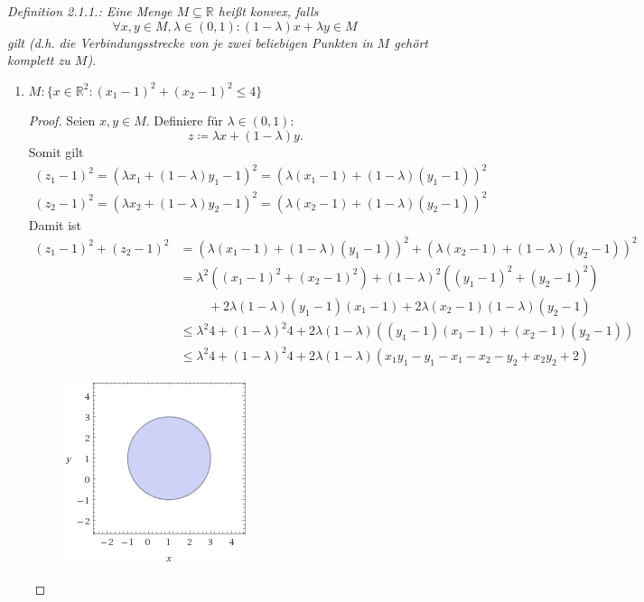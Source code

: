 \documentclass[12pt]{extreport} %
\newcommand{\R}{\mathbb{R}}
\theoremstyle{named}
\theoremstyle{nnamed}
\theoremstyle{itshape}
\theoremstyle{normal}
\begin{document}
\textit{Definition 2.1.1.:  Eine Menge $M \subseteq \R$ heißt konvex, falls}
$$  \forall x, y \in M, \lambda \in (0, 1): (1-\lambda)x + \lambda y \in M $$
\textit{gilt (d.h. die Verbindungsstrecke von je zwei beliebigen Punkten in $M$ gehört komplett zu $M$).}

\begin{enumerate}
	\item $M \colon \big\{ x \in \R^2 \colon \left( x_1 - 1 \right)^2 + \left( x_2 - 1 \right)^2 \leq 4 \big\}$
		\begin{proof}
			Seien $x, y \in M$. Definiere für $\lambda \in (0, 1)$:
			$$ z \coloneqq \lambda x + (1 - \lambda) y . $$
			Somit gilt
			\begin{align*}
				(z_1 - 1)^2 = (\lambda x_1 + (1 - \lambda) y_1 - 1)^2 = (\lambda (x_1 - 1) + (1 - \lambda) (y_1 - 1))^2 \\
				(z_2 - 1)^2 = (\lambda x_2 + (1 - \lambda) y_2 - 1)^2 = (\lambda (x_2 - 1) + (1 - \lambda) (y_2 - 1))^2		 
			\end{align*}
			Damit ist
			\begin{align*}
				(z_1 - 1)^2 + (z_2 - 1)^2 & = (\lambda (x_1 - 1) + (1 - \lambda) (y_1 - 1))^2 + (\lambda (x_2 - 1) + (1 - \lambda) (y_2 - 1))^2 \\
				& = \lambda^2 \left( (x_1 - 1)^2  + (x_2 - 1)^2 \right) + (1 - \lambda)^2 \left( (y_1 - 1)^2 +  (y_2 - 1)^2 \right) \\
				& ~\qquad + 2 \lambda (1 - \lambda) (y_1 - 1) (x_1 - 1) + 2 \lambda (x_2 - 1) (1 - \lambda) (y_2 - 1) \\
				& \leq \lambda^2 4 + (1 - \lambda)^2 4 + 2 \lambda (1 - \lambda)  \left( (y_1 - 1) (x_1 - 1) + (x_2 - 1) (y_2 - 1) \right) \\
				& \leq \lambda^2 4 + (1 - \lambda)^2 4 + 2 \lambda (1 - \lambda)  \left( x_1y_1 - y_1 - x_1 -x_2 - y_2 + x_2 y_2 +2 \right)  
			\end{align*} 
				\begin{figure}[h!] \centering
  					\includegraphics[scale=0.75]{img/suv-i}

\end{figure}
\end{proof}
\end{enumerate}
\end{document}
